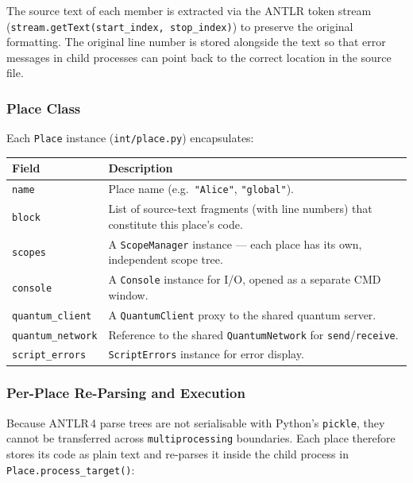 The source text of each member is extracted via the ANTLR token stream
(\texttt{stream.getText(start\_index, stop\_index)}) to preserve the
original formatting.  The original line number is stored alongside the
text so that error messages in child processes can point back to the
correct location in the source file.

\subsubsection{Place Class}

Each \texttt{Place} instance (\texttt{int/place.py}) encapsulates:

\begin{center}
\begin{tabular}{|l|p{8.5cm}|}
\hline
\textbf{Field} & \textbf{Description} \\
\hline
\texttt{name} & Place name (e.g.\ \texttt{"Alice"}, \texttt{"global"}). \\
\hline
\texttt{block} & List of source-text fragments (with line numbers) that constitute this place's code. \\
\hline
\texttt{scopes} & A \texttt{ScopeManager} instance --- each place has its own, independent scope tree. \\
\hline
\texttt{console} & A \texttt{Console} instance for I/O, opened as a separate CMD window. \\
\hline
\texttt{quantum\_client} & A \texttt{QuantumClient} proxy to the shared quantum server. \\
\hline
\texttt{quantum\_network} & Reference to the shared \texttt{QuantumNetwork} for \texttt{send}/\texttt{receive}. \\
\hline
\texttt{script\_errors} & \texttt{ScriptErrors} instance for error display. \\
\hline
\end{tabular}
\end{center}

\subsubsection{Per-Place Re-Parsing and Execution}

Because ANTLR\,4 parse trees are not serialisable with Python's
\texttt{pickle}, they cannot be transferred across
\texttt{multiprocessing} boundaries.  Each place therefore stores its
code as plain text and re-parses it inside the child process in
\texttt{Place.process\_target()}:

